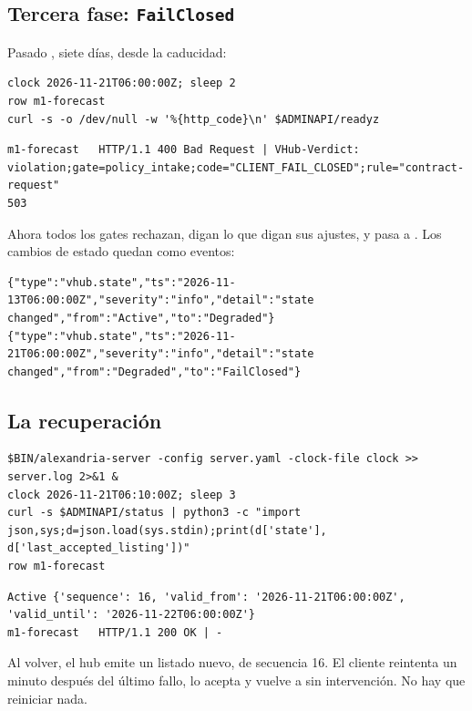 \subsection{Tercera fase: \texttt{FailClosed}}

Pasado , siete días, desde la caducidad:

\begin{lstlisting}[style=sh]
clock 2026-11-21T06:00:00Z; sleep 2
row m1-forecast
curl -s -o /dev/null -w '%{http_code}\n' $ADMINAPI/readyz
\end{lstlisting}
\begin{lstlisting}[style=out]
m1-forecast   HTTP/1.1 400 Bad Request | VHub-Verdict: violation;gate=policy_intake;code="CLIENT_FAIL_CLOSED";rule="contract-request"
503
\end{lstlisting}

Ahora todos los gates rechazan, digan lo que digan sus ajustes, y  pasa a . Los cambios de
estado quedan como eventos:

\begin{lstlisting}[style=json]
{"type":"vhub.state","ts":"2026-11-13T06:00:00Z","severity":"info","detail":"state changed","from":"Active","to":"Degraded"}
{"type":"vhub.state","ts":"2026-11-21T06:00:00Z","severity":"info","detail":"state changed","from":"Degraded","to":"FailClosed"}
\end{lstlisting}

\subsection{La recuperación}

\begin{lstlisting}[style=sh]
$BIN/alexandria-server -config server.yaml -clock-file clock >> server.log 2>&1 &
clock 2026-11-21T06:10:00Z; sleep 3
curl -s $ADMINAPI/status | python3 -c "import json,sys;d=json.load(sys.stdin);print(d['state'], d['last_accepted_listing'])"
row m1-forecast
\end{lstlisting}
\begin{lstlisting}[style=out]
Active {'sequence': 16, 'valid_from': '2026-11-21T06:00:00Z', 'valid_until': '2026-11-22T06:00:00Z'}
m1-forecast   HTTP/1.1 200 OK | -
\end{lstlisting}

Al volver, el hub emite un listado nuevo, de secuencia 16. El cliente reintenta un minuto después del último
fallo, lo acepta y vuelve a  sin intervención. No hay que reiniciar nada.

